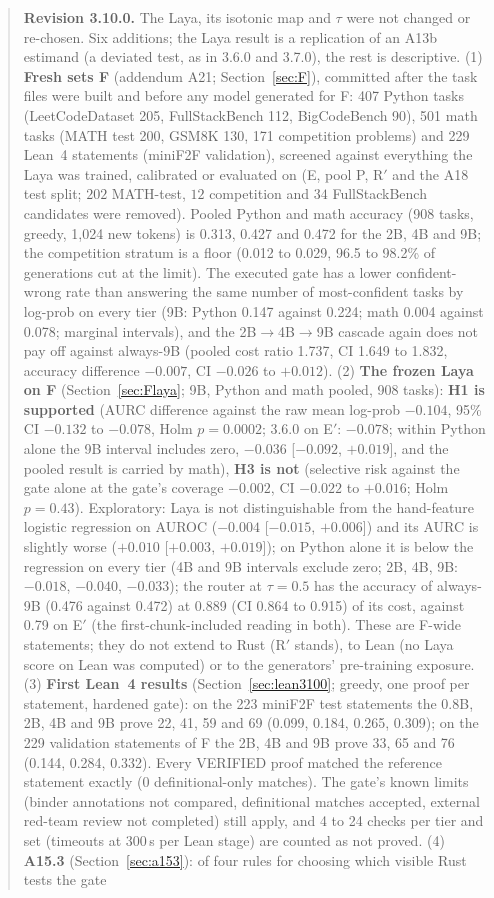 \documentclass[11pt,a4paper]{article}
\begin{document}
\begin{abstract}
\textbf{Revision 3.10.0.} The Laya, its isotonic map and $\tau$ were not changed or re-chosen. Six additions; the Laya result is a replication of an A13b estimand (a deviated test, as in 3.6.0 and 3.7.0), the rest is descriptive. (1) \textbf{Fresh sets F} (addendum A21; Section~\ref{sec:F}), committed after the task files were built and before any model generated for F: 407 Python tasks (LeetCodeDataset 205, FullStackBench 112, BigCodeBench 90), 501 math tasks (MATH test 200, GSM8K 130, 171 competition problems) and 229 Lean~4 statements (miniF2F validation), screened against everything the Laya was trained, calibrated or evaluated on (E, pool P, R$'$ and the A18 test split; $202$ MATH-test, $12$ competition and $34$ FullStackBench candidates were removed). Pooled Python and math accuracy (908 tasks, greedy, 1,024 new tokens) is 0.313, 0.427 and 0.472 for the 2B, 4B and 9B; the competition stratum is a floor (0.012 to 0.029, 96.5 to 98.2\% of generations cut at the limit). The executed gate has a lower confident-wrong rate than answering the same number of most-confident tasks by log-prob on every tier (9B: Python 0.147 against 0.224; math 0.004 against 0.078; marginal intervals), and the 2B$\to$4B$\to$9B cascade again does not pay off against always-9B (pooled cost ratio 1.737, CI 1.649 to 1.832, accuracy difference $-0.007$, CI $-0.026$ to $+0.012$). (2) \textbf{The frozen Laya on F} (Section~\ref{sec:Flaya}; 9B, Python and math pooled, 908 tasks): \textbf{H1 is supported} (AURC difference against the raw mean log-prob $-0.104$, 95\% CI $-0.132$ to $-0.078$, Holm $p=0.0002$; 3.6.0 on E$'$: $-0.078$; within Python alone the 9B interval includes zero, $-0.036$ [$-0.092$, $+0.019$], and the pooled result is carried by math), \textbf{H3 is not} (selective risk against the gate alone at the gate's coverage $-0.002$, CI $-0.022$ to $+0.016$; Holm $p=0.43$). Exploratory: Laya is not distinguishable from the hand-feature logistic regression on AUROC ($-0.004$ [$-0.015$, $+0.006$]) and its AURC is slightly worse ($+0.010$ [$+0.003$, $+0.019$]); on Python alone it is below the regression on every tier (4B and 9B intervals exclude zero; 2B, 4B, 9B: $-0.018$, $-0.040$, $-0.033$); the router at $\tau=0.5$ has the accuracy of always-9B (0.476 against 0.472) at 0.889 (CI 0.864 to 0.915) of its cost, against 0.79 on E$'$ (the first-chunk-included reading in both). These are F-wide statements; they do not extend to Rust (R$'$ stands), to Lean (no Laya score on Lean was computed) or to the generators' pre-training exposure. (3) \textbf{First Lean~4 results} (Section~\ref{sec:lean3100}; greedy, one proof per statement, hardened gate): on the 223 miniF2F test statements the 0.8B, 2B, 4B and 9B prove 22, 41, 59 and 69 (0.099, 0.184, 0.265, 0.309); on the 229 validation statements of F the 2B, 4B and 9B prove 33, 65 and 76 (0.144, 0.284, 0.332). Every VERIFIED proof matched the reference statement exactly (0 definitional-only matches). The gate's known limits (binder annotations not compared, definitional matches accepted, external red-team review not completed) still apply, and 4 to 24 checks per tier and set (timeouts at 300\,s per Lean stage) are counted as not proved. (4) \textbf{A15.3} (Section~\ref{sec:a153}): of four rules for choosing which visible Rust tests the gate 
\end{abstract}
\end{document}
